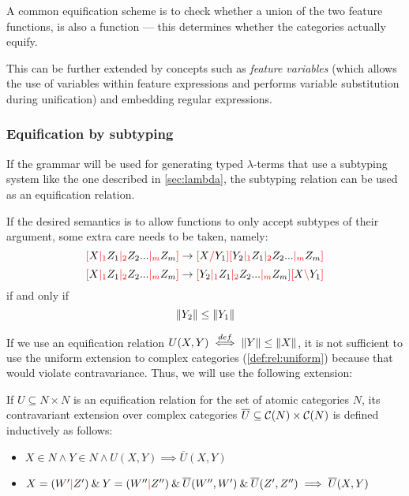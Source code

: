 \documentclass[main.tex]{subfiles}
\begin{document}
A common equification scheme is to check whether a union of the two feature functions,
is also a function --- this determines whether the categories actually equify.

This can be further extended by concepts such as \emph{feature variables}
(which allows the use of variables within feature expressions and
performs variable substitution during unification) and embedding regular expressions.

\subsubsection{Equification by subtyping}\label{hack:subtyping}
If the grammar will be used for generating typed $\lambda$-terms that use
a subtyping system like the one described in \cref{sec:lambda}, the subtyping
relation can be used as an equification relation.

If the desired semantics is to allow functions to only accept subtypes of
their argument, some extra care needs to be taken, namely:
\[ \textcolor{red}{[} X \textcolor{red}{|_{1}} Z_1 \textcolor{red}{|_{2}} Z_2 ... \textcolor{red}{|_{m}} Z_m \textcolor{red}{]} \rightarrow \textcolor{red}{[} X \textcolor{red}{/} Y_1 \textcolor{red}{]} \textcolor{red}{[} Y_2 \textcolor{red}{|_{1}} Z_1 \textcolor{red}{|_{2}} Z_2 ... \textcolor{red}{|_{m}} Z_m \textcolor{red}{]} \]
\[ \textcolor{red}{[} X \textcolor{red}{|_{1}} Z_1 \textcolor{red}{|_{2}} Z_2 ... \textcolor{red}{|_{m}} Z_m \textcolor{red}{]} \rightarrow \textcolor{red}{[} Y_2 \textcolor{red}{|_{1}} Z_1 \textcolor{red}{|_{2}} Z_2 ... \textcolor{red}{|_{m}} Z_m \textcolor{red}{]} \textcolor{red}{[} X \textcolor{red}{\backslash} Y_1 \textcolor{red}{]} \]
if and only if
\begin{equation}\label{eq:typeless}
    \|Y_2\| \leq \|Y_1\|
\end{equation}

If we use an equification relation $U(X, Y) \overset{def}{\iff} \|Y\| \leq \|X\|$,
it is not sufficient to use the uniform extension to complex categories
(\cref{def:rel:uniform}) because that would violate contravariance. Thus,
we will use the following extension:
\begin{defn}
    If $U \subseteq N \times N$ is an equification relation
    for the set of
    atomic categories $N$, its contravariant extension over complex categories
    $\overline{U} \subseteq \mathcal{C}( N ) \times \mathcal{C}( N )$ is defined
    inductively as follows:
    \begin{itemize}
        \item $X \in N \land Y \in N \land U(X, Y) \implies \overline{U}(X, Y)$
        \item $X = (W' \textcolor{red}{|} Z') \mathbin{\&} Y = (W'' \textcolor{red}{|} Z'') \mathbin{\&} \overline{U}(W'', W')
        \mathbin{\&} \overline{U}(Z', Z'')\implies \overline{U}(X, Y)$
    \end{itemize}
\end{defn}
\end{document}
